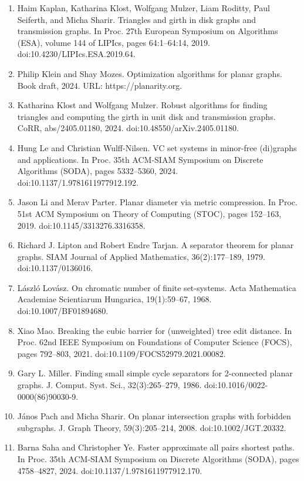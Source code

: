 \documentclass[10pt,a4paper]{article}
\begin{document}
\begin{enumerate}
\item[]  [33]  Haim Kaplan, Katharina Klost, Wolfgang Mulzer, Liam Roditty, Paul Seiferth, and Micha Sharir.  Triangles and girth in disk graphs and transmission graphs.  In Proc. 27th European Symposium on Algorithms (ESA), volume 144 of LIPIcs, pages 64:1–64:14, 2019.  doi:10.4230/LIPIcs.ESA.2019.64.  
\item[]  [34]  Philip Klein and Shay Mozes.  Optimization algorithms for planar graphs.  Book draft, 2024.  URL: https://planarity.org.  
\item[]  [35]  Katharina Klost and Wolfgang Mulzer.  Robust algorithms for finding triangles and computing the girth in unit disk and transmission graphs.  CoRR, abs/2405.01180, 2024.  doi:10.48550/arXiv.2405.01180.  
\item[]  [36]  Hung Le and Christian Wulff-Nilsen.  VC set systems in minor-free (di)graphs and applications.  In Proc. 35th ACM-SIAM Symposium on Discrete Algorithms (SODA), pages 5332–5360, 2024.  doi:10.1137/1.9781611977912.192.  
\item[]  [37]  Jason Li and Merav Parter.  Planar diameter via metric compression.  In Proc. 51st ACM Symposium on Theory of Computing (STOC), pages 152–163, 2019.  doi:10.1145/3313276.3316358.  
\item[]  [38]  Richard J. Lipton and Robert Endre Tarjan.  A separator theorem for planar graphs.  SIAM Journal of Applied Mathematics, 36(2):177–189, 1979.  doi:10.1137/0136016.  
\item[]  [39]  László Lovász.  On chromatic number of finite set-systems.  Acta Mathematica Academiae Scientiarum Hungarica, 19(1):59–67, 1968.  doi:10.1007/BF01894680.  
\item[]  [40]  Xiao Mao.  Breaking the cubic barrier for (unweighted) tree edit distance.  In Proc. 62nd IEEE Symposium on Foundations of Computer Science (FOCS), pages 792–803, 2021.  doi:10.1109/FOCS52979.2021.00082.  
\item[]  [41]  Gary L. Miller.  Finding small simple cycle separators for 2-connected planar graphs.  J. Comput. Syst. Sci., 32(3):265–279, 1986.  doi:10.1016/0022-0000(86)90030-9.  
\item[]  [42]  János Pach and Micha Sharir.  On planar intersection graphs with forbidden subgraphs.  J. Graph Theory, 59(3):205–214, 2008.  doi:10.1002/JGT.20332.  
\item[]  [43]  Barna Saha and Christopher Ye.  Faster approximate all pairs shortest paths.  In Proc. 35th ACM-SIAM Symposium on Discrete Algorithms (SODA), pages 4758–4827, 2024.  doi:10.1137/1.9781611977912.170.  

\end{enumerate}
\end{document}
